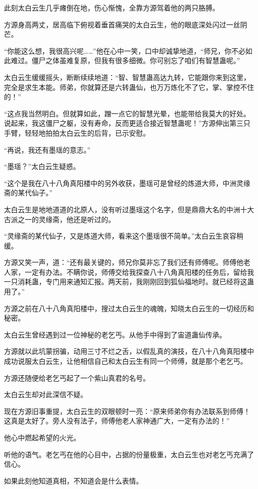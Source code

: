 \begin{this_body}
此刻太白云生几乎瘫倒在地，伤心惭愧，全靠方源驾着他的两只胳膊。

方源身高两丈，居高临下俯视着垂首痛哭的太白云生，他的眼底深处闪过一丝阴芒。

“你能这么想，我很高兴呢……”他在心中一笑，口中却诚挚地道，“师兄，你不必如此难过。僵尸之体虽难复原，但我有很多细微。你可别忘了咱们有智慧蛊呢。”

太白云生缓缓摇头，断断续续地道：“智、智慧蛊高达九转，它能跟你来到这里，完全是求生本能。师弟，你就算还是六转蛊仙，也万万炼化不了它，掌、掌控不住的！”

“这点我当然明白。但就算如此，蹭一点它的智慧光晕，也能带给我莫大的好处。说起来，我这僵尸之躯，没有寿命，反而更适合接近智慧蛊呢！”方源伸出第三只手臂，轻轻地拍拍太白云生的后背，已示安慰。

“再说，我还有墨瑶的意志。”

“墨瑶？”太白云生疑惑。

“这个是我在八十八角真阳楼中的另外收获，墨瑶可是曾经的炼道大师，中洲灵缘斋的某代仙子。”

太白云生是地地道道的北原人，没有听过墨瑶这个名字，但是鼎鼎大名的中洲十大古派之一的灵缘斋，他还是听过的。

“灵缘斋的某代仙子，又是炼道大师，看来这个墨瑶很不简单。”太白云生哀容稍缓。

方源又笑一声，道：“还有最关键的，师兄你莫非忘了我们还有师傅呢。师傅他老人家，一定有办法。不瞒你说，师傅交给我探查八十八角真阳楼的任务后，留给我一只消耗蛊，专门用来通知汇报。两天前，我刚刚回到狐仙福地时。就已经将这蛊用了。”

方源之前在八十八角真阳楼中，搜过太白云生的魂魄，知晓太白云生的一切经历和秘密。

太白云生曾经遇到过一位神秘的老乞丐。从他手中得到了宙道蛊仙传承。

方源就以此坑蒙拐骗，动用三寸不烂之舌，以假乱真的演技，在八十八角真阳楼中成功说服太白云生，让他相信自己和太白云生有同一个师傅，就是那个老乞丐。

方源还随便给老乞丐起了一个紫山真君的名号。

太白云生却对此深信不疑。

现在方源旧事重提，太白云生的双眼顿时一亮：“原来师弟你有办法联系到师傅！这真是太好了。旁人没有法子，师傅他老人家神通广大，一定有办法的！”

他心中燃起希望的火光。

听他的语气。老乞丐在他的心目中，占据的份量极重，太白云生也对老乞丐充满了信心。

如果此刻他知道真相，不知道会是什么表情。


\end{this_body}
